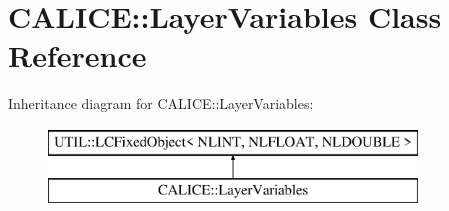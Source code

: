 \section{C\-A\-L\-I\-C\-E\-:\-:Layer\-Variables Class Reference}
\label{classCALICE_1_1LayerVariables}
Inheritance diagram for C\-A\-L\-I\-C\-E\-:\-:Layer\-Variables\-:\begin{figure}[H]
\begin{center}
\leavevmode
\includegraphics[height=2.000000cm]{classCALICE_1_1LayerVariables}
\end{center}
\end{figure}
